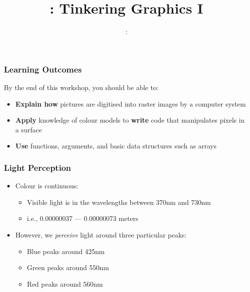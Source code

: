 \usepackage{../../../beamerthemeFalmouthGamesAcademy}
\usepackage{multimedia}
\graphicspath{ {../../../} }


\usepackage[normalem]{ulem}
\usepackage{wasysym}

\usepackage{pdfpages}

\usetikzlibrary{arrows,automata}







\title{\sessionnumber: Tinkering Graphics I}
\subtitle{\modulecode: \moduletitle}

\frame{\titlepage} 

\begin{frame}
	\frametitle{Learning Outcomes}
	By the end of this workshop, you should be able to:	
	\begin{itemize}
		\item \textbf{Explain how} pictures are digitised into raster images by a computer system
		\item \textbf{Apply} knowledge of colour models to \textbf{write} code that manipulates pixels in a surface
		\item \textbf{Use} functions, arguments, and basic data structures such as arrays
	\end{itemize}
\end{frame}

\begin{frame}
	\frametitle{Light Perception}
	\begin{itemize}
		\item Colour is continuous:
		\begin{itemize}
			\item Visible light is in the wavelengths between 370nm and 730nm
			\item i.e., 0.00000037 --- 0.00000073 meters
		\end{itemize}
		\item However, we \textit{perceive} light around three particular peaks:
		\begin{itemize}
			\item Blue peaks around 425nm
			\item Green peaks around 550nm
			\item Red peaks around 560nm
		\end{itemize}
	\end{itemize}
\end{frame}

